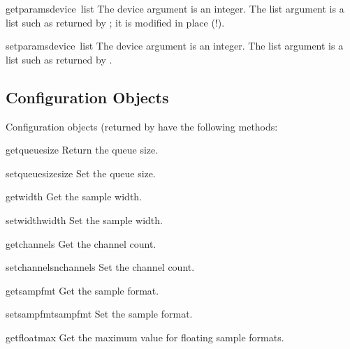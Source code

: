 \begin{funcdesc}{getparams}{device\, list}
The device argument is an integer.  The list argument is a list such
as returned by ; it is modified in place (!).
\end{funcdesc}

\begin{funcdesc}{setparams}{device\, list}
The device argument is an integer.  The list argument is a list such
as returned by .
\end{funcdesc}

\subsection{Configuration Objects}

Configuration objects (returned by  have the
following methods:


\begin{funcdesc}{getqueuesize}{}
Return the queue size.
\end{funcdesc}

\begin{funcdesc}{setqueuesize}{size}
Set the queue size.
\end{funcdesc}

\begin{funcdesc}{getwidth}{}
Get the sample width.
\end{funcdesc}

\begin{funcdesc}{setwidth}{width}
Set the sample width.
\end{funcdesc}

\begin{funcdesc}{getchannels}{}
Get the channel count.
\end{funcdesc}

\begin{funcdesc}{setchannels}{nchannels}
Set the channel count.
\end{funcdesc}

\begin{funcdesc}{getsampfmt}{}
Get the sample format.
\end{funcdesc}

\begin{funcdesc}{setsampfmt}{sampfmt}
Set the sample format.
\end{funcdesc}

\begin{funcdesc}{getfloatmax}{}
Get the maximum value for floating sample formats.
\end{funcdesc}

